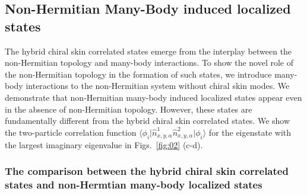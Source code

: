 \documentclass[longbibliography, aps, prx, amsmath, amssymb, amsfonts, twocolumn,superscriptaddress, footinbib]{revtex4-1}
\begin{document}
	\subsection{Non-Hermitian Many-Body induced localized states\label{sec:NHMBL}}

	The hybrid chiral skin correlated states emerge from the interplay between the non-Hermitian topology and many-body interactions. To show the novel role of the non-Hermitian topology in the formation of such states, we introduce many-body interactions to the non-Hermitian system without chiral skin modes.
	We demonstrate that non-Hermitian many-body induced localized states appear even in the absence of non-Hermitian topology. However, these states are fundamentally different from the hybrid chiral skin correlated states.
    We show the two-particle correlation function $\langle \phi_i \vert \hat{n}^1_{x,y,\alpha} \hat{n}^2_{x,y,\alpha} \vert \phi_i \rangle$ for the eigenstate with the largest imaginary eigenvalue in Figs.~\ref{fig:02} (c-d).

	\subsubsection{The comparison between the hybrid chiral skin correlated states and non-Hermtian many-body localized states~\label{sec:appendixE_comp}}
    
\end{document}
